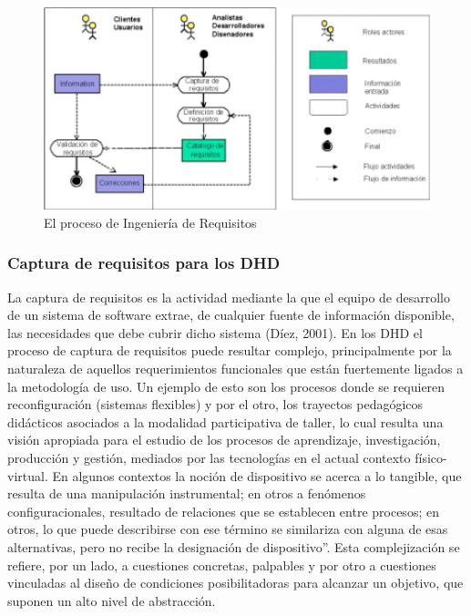 \begin{figure}
\begin{center}
 \includegraphics[width=4 in,totalheight=3 in] {DHD/requerimientos}
\caption{El proceso de Ingeniería de Requisitos} \label{fig: Requerimientos}
\end{center}
\end{figure}


\subsubsection{Captura de requisitos para los DHD}

La captura de requisitos es la actividad mediante la que el equipo de desarrollo
de un sistema de software extrae, de cualquier fuente de información disponible,
las necesidades que debe cubrir dicho sistema (Díez, 2001). En los DHD el
proceso de captura de requisitos puede resultar complejo, principalmente por la
naturaleza de aquellos requerimientos funcionales que están fuertemente
ligados a la metodología de uso. Un ejemplo de esto son los procesos donde se
requieren reconfiguración (sistemas flexibles) y por el otro, los trayectos
pedagógicos didácticos asociados a la modalidad participativa de taller, lo cual
resulta una visión apropiada para el estudio de los procesos de aprendizaje,
investigación, producción y gestión, mediados por las tecnologías en el actual
contexto físico-virtual. En algunos contextos la noción de dispositivo se
acerca a lo tangible, que resulta de una manipulación instrumental; en otros a
fenómenos configuracionales, resultado de relaciones que se establecen entre
procesos; en otros, lo que puede describirse con ese término se similariza con
alguna de esas alternativas, pero no recibe la designación de dispositivo”. Esta
complejización se refiere, por un lado, a cuestiones concretas, palpables y por
otro a cuestiones vinculadas al diseño de condiciones posibilitadoras para
alcanzar un objetivo, que suponen un alto nivel de abstracción.


